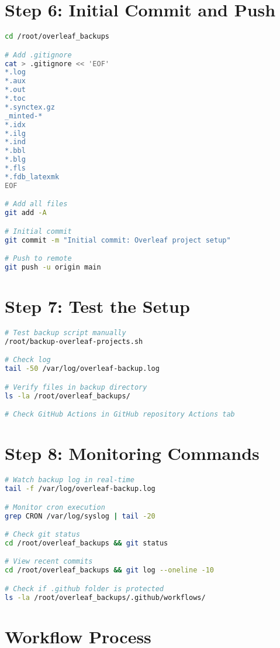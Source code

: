 \section{Step 6: Initial Commit and Push}

\begin{lstlisting}[language=bash]
cd /root/overleaf_backups

# Add .gitignore
cat > .gitignore << 'EOF'
*.log
*.aux
*.out
*.toc
*.synctex.gz
_minted-*
*.idx
*.ilg
*.ind
*.bbl
*.blg
*.fls
*.fdb_latexmk
EOF

# Add all files
git add -A

# Initial commit
git commit -m "Initial commit: Overleaf project setup"

# Push to remote
git push -u origin main
\end{lstlisting}

\section{Step 7: Test the Setup}

\begin{lstlisting}[language=bash]
# Test backup script manually
/root/backup-overleaf-projects.sh

# Check log
tail -50 /var/log/overleaf-backup.log

# Verify files in backup directory
ls -la /root/overleaf_backups/

# Check GitHub Actions in GitHub repository Actions tab
\end{lstlisting}

\section{Step 8: Monitoring Commands}

\begin{lstlisting}[language=bash]
# Watch backup log in real-time
tail -f /var/log/overleaf-backup.log

# Monitor cron execution
grep CRON /var/log/syslog | tail -20

# Check git status
cd /root/overleaf_backups && git status

# View recent commits
cd /root/overleaf_backups && git log --oneline -10

# Check if .github folder is protected
ls -la /root/overleaf_backups/.github/workflows/
\end{lstlisting}

\section{Workflow Process}

